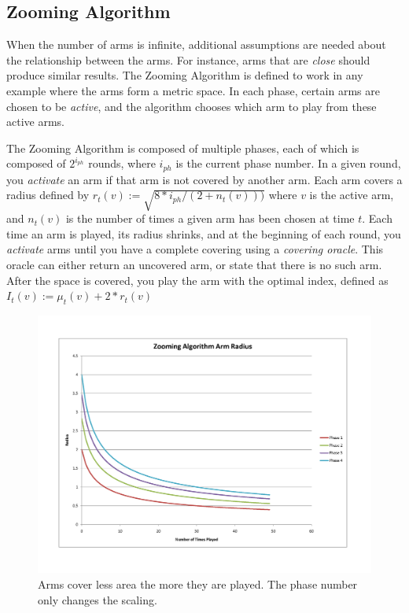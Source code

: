 \subsection{Zooming Algorithm}
When the number of arms is infinite, additional assumptions are needed
about the relationship between the arms. For instance, arms that are
\emph{close} should produce similar results. The Zooming Algorithm is
defined to work in any example where the arms form a metric space. In
each phase, certain arms are chosen to be \emph{active}, and the
algorithm chooses which arm to play from these active arms.

The Zooming Algorithm is composed of multiple phases, each of which is
composed of $2^{i_{ph}}$ rounds, where $i_{ph}$ is the current phase
number. In a given round, you \emph{activate} an arm if that arm is
not covered by another arm. Each arm covers a radius defined by
$r_t(v):=\sqrt{8*i_{ph}/(2+n_t(v)))}$ where $v$ is the active arm, and
$n_t(v)$ is the number of times a given arm has been chosen at time
$t$. Each time an arm is played, its radius shrinks, and at the
beginning of each round, you \emph{activate} arms until you have a
complete covering using a \emph{covering oracle}. This oracle can
either return an uncovered arm, or state that there is no such
arm. After the space is covered, you play the arm with the optimal
index, defined as $I_t(v):=\mu_t(v)+2*r_t(v)$

\begin{figure}[!ht]
  \begin{center}
    \includegraphics[width=5 in]{figures/ZoomingRadius.png}
     \caption{Arms cover less area the more they are played. The phase
       number only changes the scaling.}
     \label{fig:zoomradius}
  \end{center}
\end{figure}

